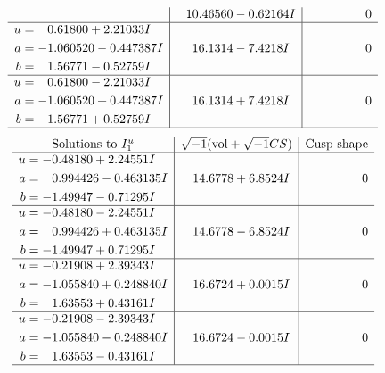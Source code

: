 \documentclass[1p]{elsarticle_modified}
\theoremstyle{definition}
\newcommand{\I}{\sqrt{-1}}
\begin{document}
$$\begin{array}{c|c|c}
 & \phantom{-}10.46560 - 0.62164 I & \phantom{-0.000000 } 0 \\ \hline\begin{aligned}
u &= \phantom{-}0.61800 + 2.21033 I \\
a &= -1.060520 - 0.447387 I \\
b &= \phantom{-}1.56771 - 0.52759 I\end{aligned}
 & \phantom{-}16.1314 - 7.4218 I & \phantom{-0.000000 } 0 \\ \hline\begin{aligned}
u &= \phantom{-}0.61800 - 2.21033 I \\
a &= -1.060520 + 0.447387 I \\
b &= \phantom{-}1.56771 + 0.52759 I\end{aligned}
 & \phantom{-}16.1314 + 7.4218 I & \phantom{-0.000000 } 0\\
 \hline 
 \end{array}$$\newpage$$\begin{array}{c|c|c}  
\text{Solutions to }I^u_{1}& \I (\text{vol} + \sqrt{-1}CS) & \text{Cusp shape}\\
 \hline 
\begin{aligned}
u &= -0.48180 + 2.24551 I \\
a &= \phantom{-}0.994426 - 0.463135 I \\
b &= -1.49947 - 0.71295 I\end{aligned}
 & \phantom{-}14.6778 + 6.8524 I & \phantom{-0.000000 } 0 \\ \hline\begin{aligned}
u &= -0.48180 - 2.24551 I \\
a &= \phantom{-}0.994426 + 0.463135 I \\
b &= -1.49947 + 0.71295 I\end{aligned}
 & \phantom{-}14.6778 - 6.8524 I & \phantom{-0.000000 } 0 \\ \hline\begin{aligned}
u &= -0.21908 + 2.39343 I \\
a &= -1.055840 + 0.248840 I \\
b &= \phantom{-}1.63553 + 0.43161 I\end{aligned}
 & \phantom{-}16.6724 + 0.0015 I & \phantom{-0.000000 } 0 \\ \hline\begin{aligned}
u &= -0.21908 - 2.39343 I \\
a &= -1.055840 - 0.248840 I \\
b &= \phantom{-}1.63553 - 0.43161 I\end{aligned}
 & \phantom{-}16.6724 - 0.0015 I & \phantom{-0.000000 } 0\\
 \hline 
 \end{array}$$\newpage\newpage\renewcommand{\arraystretch}{1}
\end{document}
